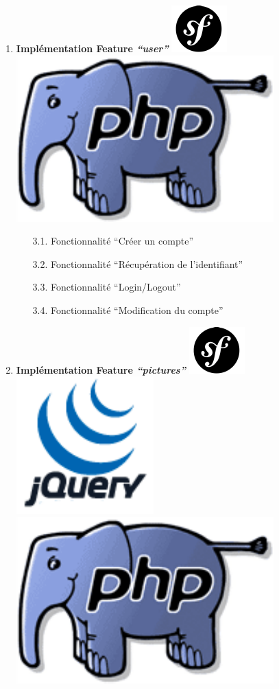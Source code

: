 \documentclass{article}
\begin{document}
\begin{sffamily}
\begin{enumerate}
\item \textbf{Implémentation Feature \textit{``user''}} \includegraphics[scale=0.5]{symfony.pdf} \includegraphics[scale=0.15]{php.pdf}
	\begin{enumerate}
		\item[3.1.] Fonctionnalité ``Créer un compte''
		\item[3.2.] Fonctionnalité ``Récupération de l'identifiant''
		\item[3.3.] Fonctionnalité ``Login/Logout''	
		\item[3.4.] Fonctionnalité ``Modification du compte''	
	\end{enumerate}
\item \textbf{Implémentation Feature \textit{``pictures''}} \includegraphics[scale=0.5]{symfony.pdf}\includegraphics[scale=0.2]{jquery.pdf}\includegraphics[scale=0.15]{php.pdf}

\end{enumerate}
\end{sffamily}
\end{document}
